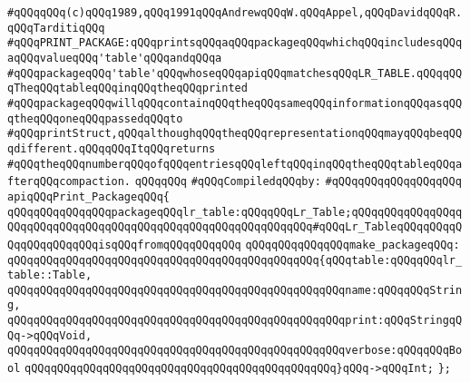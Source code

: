 \label{src/app/yacc/src/print-package.api}
\verb|#qQQqqQQq(c)qQQq1989,qQQq1991qQQqAndrewqQQqW.qQQqAppel,qQQqDavidqQQqR.qQQqTarditiqQQq|\newline
\verb|#qQQqPRINT_PACKAGE:qQQqprintsqQQqaqQQqpackageqQQqwhichqQQqincludesqQQqaqQQqvalueqQQq'table'qQQqandqQQqa|\newline
\verb|#qQQqpackageqQQq'table'qQQqwhoseqQQqapiqQQqmatchesqQQqLR_TABLE.qQQqqQQqTheqQQqtableqQQqinqQQqtheqQQqprinted|\newline
\verb|#qQQqpackageqQQqwillqQQqcontainqQQqtheqQQqsameqQQqinformationqQQqasqQQqtheqQQqoneqQQqpassedqQQqto|\newline
\verb|#qQQqprintStruct,qQQqalthoughqQQqtheqQQqrepresentationqQQqmayqQQqbeqQQqdifferent.qQQqqQQqItqQQqreturns|\newline
\verb|#qQQqtheqQQqnumberqQQqofqQQqentriesqQQqleftqQQqinqQQqtheqQQqtableqQQqafterqQQqcompaction.|\newline
\verb|qQQqqQQq|\newline
\verb|#qQQqCompiledqQQqby:|\newline
\verb|#qQQqqQQqqQQqqQQqqQQq|\newline
\newline
\verb|apiqQQqPrint_PackageqQQq{|\newline
\newline
\verb|qQQqqQQqqQQqqQQqpackageqQQqlr_table:qQQqqQQqLr_Table;qQQqqQQqqQQqqQQqqQQqqQQqqQQqqQQqqQQqqQQqqQQqqQQqqQQqqQQqqQQqqQQq#qQQqLr_TableqQQqqQQqqQQqqQQqqQQqqQQqisqQQqfromqQQqqQQqqQQq|\newline
\newline
\verb|qQQqqQQqqQQqqQQqmake_packageqQQq:|\newline
\verb|qQQqqQQqqQQqqQQqqQQqqQQqqQQqqQQqqQQqqQQqqQQqqQQq{qQQqtable:qQQqqQQqlr_table::Table,|\newline
\verb|qQQqqQQqqQQqqQQqqQQqqQQqqQQqqQQqqQQqqQQqqQQqqQQqqQQqname:qQQqqQQqString,|\newline
\verb|qQQqqQQqqQQqqQQqqQQqqQQqqQQqqQQqqQQqqQQqqQQqqQQqqQQqprint:qQQqStringqQQq->qQQqVoid,|\newline
\verb|qQQqqQQqqQQqqQQqqQQqqQQqqQQqqQQqqQQqqQQqqQQqqQQqqQQqverbose:qQQqqQQqBool|\newline
\verb|qQQqqQQqqQQqqQQqqQQqqQQqqQQqqQQqqQQqqQQqqQQqqQQq}qQQq->qQQqInt;|\newline
\verb|};|\newline
\newline

